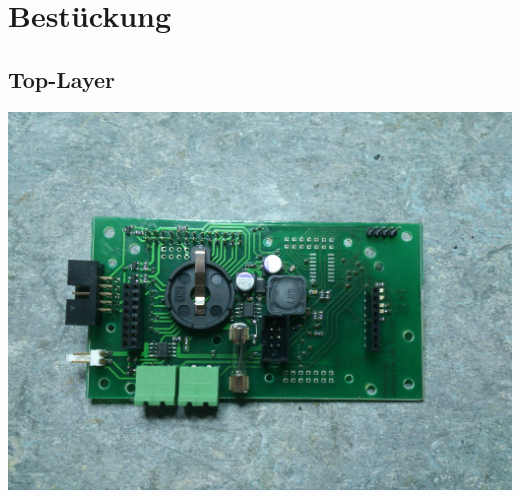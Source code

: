 \documentclass[a4paper,10pt]{article}
\begin{document}


\newpage

\section{Bestückung}

\subsection{Top-Layer}

\includegraphics[width=\textwidth]{pointhiboard_board_top} \\
\end{document}

